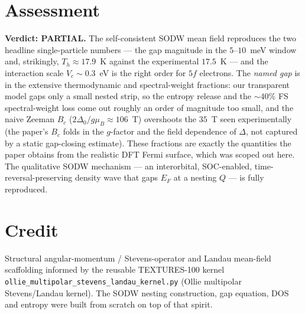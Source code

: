 \documentclass[11pt]{article}
\begin{document}
\section{Assessment}
\textbf{Verdict: PARTIAL.} The self-consistent SODW mean field reproduces the two
headline single-particle numbers --- the gap magnitude in the $5$--$10$~meV window
and, strikingly, $T_h\approx17.9$~K against the experimental $17.5$~K --- and the
interaction scale $V_c\sim0.3$~eV is the right order for $5f$ electrons. The
\emph{named gap} is in the extensive thermodynamic and spectral-weight fractions:
our transparent model gaps only a small nested strip, so the entropy release and
the $\sim40\%$ FS spectral-weight loss come out roughly an order of magnitude too
small, and the naive Zeeman $B_c$ ($2\Delta_0/g\mu_B\approx106$~T) overshoots the
$35$~T seen experimentally (the paper's $B_c$ folds in the $g$-factor and the field
dependence of $\Delta$, not captured by a static gap-closing estimate). These
fractions are exactly the quantities the paper obtains from the realistic DFT Fermi
surface, which was scoped out here. The qualitative SODW mechanism --- an
interorbital, SOC-enabled, time-reversal-preserving density wave that gaps $E_F$ at
a nesting $Q$ --- is fully reproduced.

\section*{Credit}
Structural angular-momentum / Stevens-operator and Landau mean-field scaffolding
informed by the reusable TEXTURES-100 kernel
\texttt{ollie\_multipolar\_stevens\_landau\_kernel.py} (Ollie multipolar
Stevens/Landau kernel). The SODW nesting construction, gap equation, DOS and
entropy were built from scratch on top of that spirit.
\end{document}
